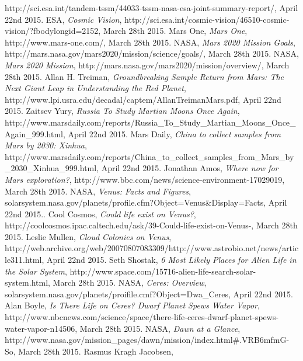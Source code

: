 \begin{thebibliography}{99}
		http://sci.esa.int/tandem-tssm/44033-tssm-nasa-esa-joint-summary-report/,
		April 22nd 2015.
		ESA,
		\emph{Cosmic Vision},
		http://sci.esa.int/cosmic-vision/46510-cosmic-vision/?fbodylongid=2152,
		March 28th 2015.
		Mars One,
		\emph{Mars One},
		http://www.mars-one.com/,
		March 28th 2015.
		NASA,
		\emph{Mars 2020 Mission Goals},
		http://mars.nasa.gov/mars2020/mission/science/goals/,
		March 28th 2015.
		NASA,
		\emph{Mars 2020 Mission},
		http://mars.nasa.gov/mars2020/mission/overview/,
		March 28th 2015.
		Allan H. Treiman,
		\emph{Groundbreaking Sample Return from Mars: The Next Giant Leap in Understanding the Red Planet},
		http://www.lpi.usra.edu/decadal/captem/AllanTreimanMars.pdf,
		April 22nd 2015.
		Zaitsev Yury,
		\emph{Russia To Study Martian Moons Once Again},
		http://www.marsdaily.com/reports/Russia\_To\_Study\_Martian\_Moons\_Once\_Again\_999.html,
		April 22nd 2015.
		Mars Daily,
		\emph{China to collect samples from Mars by 2030: Xinhua},
		http://www.marsdaily.com/reports/China\_to\_collect\_samples\_from\_Mars\_by\_2030\_Xinhua\_999.html,
		April 22nd 2015.
		Jonathan Amos,
		\emph{Where now for Mars exploration?},
		http://www.bbc.com/news/science-environment-17029019,
		March 28th 2015.
		NASA,
		\emph{Venus: Facts and Figures},
		solarsystem.nasa.gov/planets/profile.cfm?Object=Venus\&Display=Facts,
		April 22nd 2015..
		Cool Cosmos,
		\emph{Could life exist on Venus?},
		http://coolcosmos.ipac.caltech.edu/ask/39-Could-life-exist-on-Venus-,
		March 28th 2015.
		Leslie Mullen,
		\emph{Cloud Colonies on Venus},
		http://web.archive.org/web/20070807083309/http://www.astrobio.net/news/article311.html,
		April 22nd 2015.
		Seth Shostak,
		\emph{6 Most Likely Places for Alien Life in the Solar System},
		http://www.space.com/15716-alien-life-search-solar-system.html,
		March 28th 2015.
		NASA,
		\emph{Ceres: Overview},
		solarsystem.nasa.gov/planets/proifile.cmf?Object=Dwa\_Ceres,
		April 22nd 2015.
		Alan Boyle,
		\emph{Is There Life on Ceres? Dwarf Planet Spews Water Vapor},
		http://www.nbcnews.com/science/space/there-life-ceres-dwarf-planet-spews-water-vapor-n14506,
		March 28th 2015.
		NASA,
		\emph{Dawn at a Glance},
		http://www.nasa.gov/mission\_pages/dawn/mission/index.html\#.VRB6mfmG-So,
		March 28th 2015.
		Rasmus Kragh Jacobsen,

\end{thebibliography}
